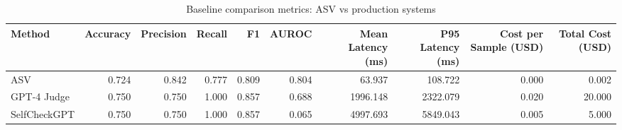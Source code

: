 \begin{table}
\caption{Baseline comparison metrics: ASV vs production systems}
\label{tab:baseline-comparison}
\begin{tabular}{lrrrrrrrrr}
\toprule
Method & Accuracy & Precision & Recall & F1 & AUROC & Mean Latency (ms) & P95 Latency (ms) & Cost per Sample (USD) & Total Cost (USD) \\
\midrule
ASV & 0.724 & 0.842 & 0.777 & 0.809 & 0.804 & 63.937 & 108.722 & 0.000 & 0.002 \\
GPT-4 Judge & 0.750 & 0.750 & 1.000 & 0.857 & 0.688 & 1996.148 & 2322.079 & 0.020 & 20.000 \\
SelfCheckGPT & 0.750 & 0.750 & 1.000 & 0.857 & 0.065 & 4997.693 & 5849.043 & 0.005 & 5.000 \\
\bottomrule
\end{tabular}
\end{table}
